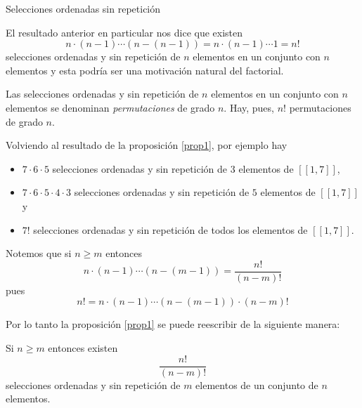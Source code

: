 \begin{section}{Selecciones ordenadas sin repetición}
\begin{observacion*}
El resultado anterior en particular nos dice que existen
$$
n \cdot (n - 1) \cdots (n - (n - 1)) = n \cdot (n - 1) \cdots 1 = n!
$$
selecciones ordenadas y sin repetición de  $n$ elementos en un conjunto con $n$ elementos y esta podría ser una motivación natural del factorial.


Las selecciones ordenadas y sin repetición de  $n$ elementos en un conjunto con $n$ elementos se denominan {\em permutaciones} de grado $n$. Hay, pues, $n!$ permutaciones de grado $n$.
\end{observacion*}

Volviendo al resultado de la proposición \ref{prop1}, por ejemplo hay 
\begin{itemize}
\item $7 \cdot 6 \cdot 5$ selecciones ordenadas y sin repetición de $3$ elementos de  $[[1,7]]$,
\item $7 \cdot 6 \cdot 5 \cdot 4 \cdot 3$  selecciones ordenadas y sin repetición de $5$ elementos de $[[1,7]]$ y
\item $7!$  selecciones ordenadas y sin repetición de todos los elementos de $[[1,7]]$.
\end{itemize}

Notemos que si $n \ge m$ entonces
$$
n \cdot (n - 1) \cdots (n - (m - 1)) = \frac{n!}{(n - m)!}
$$
pues
$$
n! = n \cdot (n - 1 ) \cdots (n -(m - 1 ) ) \cdot (n -m)!
$$

Por lo tanto  la proposición \ref{prop1} se puede reescribir de 
la siguiente manera:


\begin{proposicion}Si $n \ge m$ entonces existen
\begin{equation*}
\frac{n!}{(n - m)!}
\end{equation*}
selecciones ordenadas y sin repetición de $m$ elementos de un conjunto de $n$ elementos.
\end{proposicion}



\end{section}

